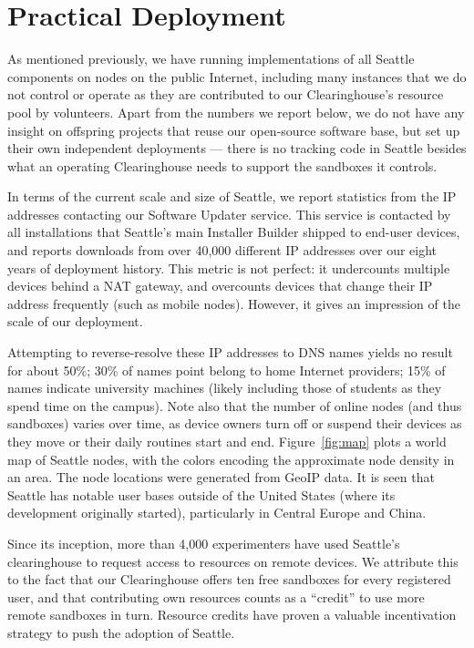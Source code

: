 \section{Practical Deployment}\label{sec-deployment}

As mentioned previously, we have running implementations of all
Seattle components on nodes on the public Internet, including
many instances that we do not control or operate as they are
contributed to our Clearinghouse's resource pool by volunteers.
Apart from the numbers we report below, we do not have any
insight on offspring projects that reuse our open-source software
base, but set up their own independent deployments --- there is
no tracking code in Seattle besides what an operating Clearinghouse
needs to support the sandboxes it controls.

In terms of the current scale and size of Seattle, we report
statistics from the \gls{IP} addresses contacting our Software
Updater service. This service is contacted
by all installations that Seattle's main Installer Builder shipped
to end-user devices, and reports downloads from over 40,000
different \gls{IP} addresses over our eight years of deployment history.
This metric is not perfect: it undercounts multiple devices behind
a \gls{NAT} gateway, and overcounts devices that change their
\gls{IP} address frequently (such as mobile nodes). However, it
gives an impression of the scale of our deployment.

Attempting to reverse-resolve these \gls{IP} addresses to \gls{DNS}
names yields no result for about 50\%; 30\% of names point belong
to home Internet providers; 15\% of names indicate
university machines (likely including those of students as they
spend time on the campus). Note also that the number of online
nodes (and thus sandboxes) varies over time, as device owners
turn off or suspend their devices as they move or their daily
routines start and end.
Figure~\ref{fig:map} plots a world map of Seattle nodes, with the
colors encoding the approximate node density in an area.
The node locations were generated from GeoIP data.
It is seen that Seattle has notable user bases outside of the
United States (where its development originally started),
particularly in Central Europe and China.

Since its inception,
more than 4,000 experimenters have used Seattle's clearinghouse
to request access to resources on remote devices. We attribute this
to the fact that our Clearinghouse offers ten free sandboxes for
every registered user, and that contributing own resources counts
as a ``credit'' to use more remote sandboxes in turn.
Resource credits have proven a valuable incentivation strategy
to push the adoption of Seattle.

